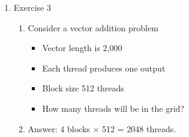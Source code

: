 \documentclass{article}
\begin{document}
\begin{enumerate}
\begin{enumerate}
        \item Exercise 3
        \begin{enumerate}
            \item Consider a vector addition problem
            \begin{itemize}
                \item Vector length is 2,000
                \item Each thread produces one output
                \item Block size 512 threads
                \item [] How many threads will be in the grid?
            \end{itemize}
            \item Answer: 4 blocks $\times$ 512 = 2048 threads.
        \end{enumerate}
        
    \end{enumerate}

\end{enumerate}
\end{document}

